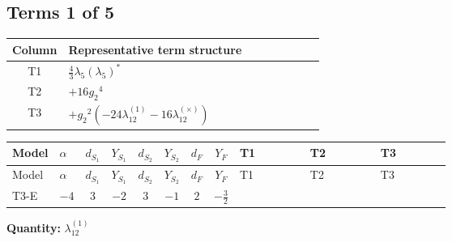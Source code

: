 \documentclass[8pt]{article}
\begin{document}
\begin{landscape}
\subsection*{Terms 1 of 5}
\begin{center}
\begin{tabular}{@{}c >{\raggedright\arraybackslash}p{0.82\linewidth}@{}}
\toprule
Column & Representative term structure \\
\midrule
T1 & \(\displaystyle \frac{4}{3} {\lambda_5} \left({\lambda_5}\right)^{*}\) \\
\midrule
T2 & \(\displaystyle +16 {g_2}^4\) \\
\midrule
T3 & \(\displaystyle +{g_2}^2 (-24 {\lambda_{12}^{(1)}}-16 {\lambda_{12}^{(\times)}})\) \\
\midrule
\bottomrule
\end{tabular}
\end{center}
\smallskip
\tiny
\begin{longtable}{@{}llcccccc >{\raggedright\arraybackslash}p{0.21\linewidth} >{\raggedright\arraybackslash}p{0.21\linewidth} >{\raggedright\arraybackslash}p{0.21\linewidth}@{}}
\toprule
Model & $\alpha$ & $d_{S_1}$ & $Y_{S_1}$ & $d_{S_2}$ & $Y_{S_2}$ & $d_F$ & $Y_F$ & T1 & T2 & T3 \\
\midrule
\endfirsthead
\toprule
Model & $\alpha$ & $d_{S_1}$ & $Y_{S_1}$ & $d_{S_2}$ & $Y_{S_2}$ & $d_F$ & $Y_F$ & T1 & T2 & T3 \\
\midrule
\endhead
T3-E & $-4$ & $3$ & $-2$ & $3$ & $-1$ & $2$ & $-\frac{3}{2}$ & \scriptsize\adjustbox{max width=\linewidth}{$\begin{gathered} \frac{4}{3} {\lambda_5} \left({\lambda_5}\right)^{*}\end{gathered}$} & \scriptsize\adjustbox{max width=\linewidth}{$\begin{gathered} +16 {g_2}^4\end{gathered}$} & \scriptsize\adjustbox{max width=\linewidth}{$\begin{gathered} +{g_2}^2 (-24 {\lambda_{12}^{(1)}}-16 {\lambda_{12}^{(\times)}})\end{gathered}$} \\
\midrule
\bottomrule
\end{longtable}
\clearpage
\noindent\textbf{Quantity: }$\lambda_{12}^{(1)}$\par\smallskip

\end{landscape}
\end{document}
